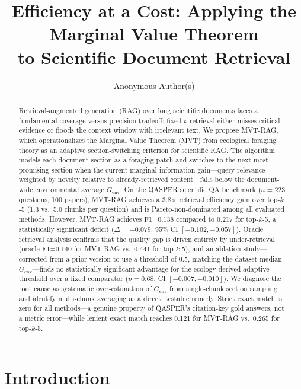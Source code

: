 \documentclass[11pt,letterpaper]{article}
\title{\textbf{Efficiency at a Cost: Applying the Marginal Value Theorem\\to Scientific Document Retrieval}}
\author{%
  Anonymous Author(s)
}
\date{}
\begin{document}
\maketitle

\begin{abstract}
Retrieval-augmented generation (RAG) over long scientific documents faces a fundamental coverage-versus-precision tradeoff:
fixed-$k$ retrieval either misses critical evidence or floods the context window with irrelevant text. We propose MVT-RAG,
which operationalizes the Marginal Value Theorem (MVT) from ecological foraging theory as an adaptive section-switching
criterion for scientific RAG. The algorithm models each document section as a foraging patch and switches to the next most
promising section when the current marginal information gain---query relevance weighted by novelty relative to already-retrieved
content---falls below the document-wide environmental average $G_{\mathrm{env}}$. On the QASPER scientific QA benchmark ($n=223$
questions, 100 papers), MVT-RAG achieves a 3.8$\times$ retrieval efficiency gain over top-$k$-5 (1.3 vs.\ 5.0 chunks per
question) and is Pareto-non-dominated among all evaluated methods. However, MVT-RAG achieves F1=0.138 compared to 0.217
for top-$k$-5, a statistically significant deficit ($\Delta=-0.079$, 95\% CI $[-0.102, -0.057]$). Oracle retrieval analysis
confirms that the quality gap is driven entirely by under-retrieval (oracle F1=0.140 for MVT-RAG vs.\ 0.441 for top-$k$-5),
and an ablation study---corrected from a prior version to use a threshold of 0.5, matching the dataset median
$G_{\mathrm{env}}$---finds no statistically significant advantage for the ecology-derived adaptive threshold over a fixed
comparator ($p=0.68$, CI $[-0.007, +0.010]$). We diagnose the root cause as systematic over-estimation of $G_{\mathrm{env}}$
from single-chunk section sampling and identify multi-chunk averaging as a direct, testable remedy. Strict exact match is zero
for all methods---a genuine property of QASPER's citation-key gold answers, not a metric error---while lenient exact match
reaches 0.121 for MVT-RAG vs.\ 0.265 for top-$k$-5.
\end{abstract}

\section{Introduction}
\end{document}

